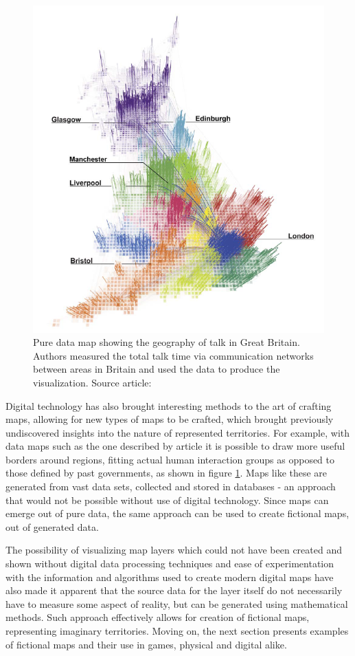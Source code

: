 \documentclass[12pt]{report}
\begin{document}
\begin{figure}[h!]
	\centering
	\includegraphics[width=0.6\linewidth]{images/journal_netw_talk_map}
	\caption{Pure data map showing the geography of talk in Great Britain. Authors measured the total talk time via communication networks between areas in Britain and used the data to produce the visualization. Source article: \autocite{10.1371/journal.pone.0014248}}
	\label{fig:journalnetwtalkmap}
\end{figure}


Digital technology has also brought interesting methods to the art of crafting maps, allowing for new types of maps to be crafted, which brought previously undiscovered insights into the nature of represented territories. For example, with data maps such as the one described by article \autocite{10.1371/journal.pone.0014248} it is possible to draw more useful borders around regions, fitting actual human interaction groups as opposed to those defined by past governments, as shown in figure \cref{fig:journalnetwtalkmap}. Maps like these are generated from vast data sets, collected and stored in databases - an approach that would not be possible without use of digital technology. Since maps can emerge out of pure data, the same approach can be used to create fictional maps, out of generated data.

The possibility of visualizing map layers which could not have been created and shown without digital data processing techniques and ease of experimentation with the information and algorithms used to create modern digital maps have also made it apparent that the source data for the layer itself do not necessarily have to measure some aspect of reality, but can be generated using mathematical methods. Such approach effectively allows for creation of fictional maps, representing imaginary territories. Moving on, the next section presents examples of fictional maps and their use in games, physical and digital alike. 
\end{document}
